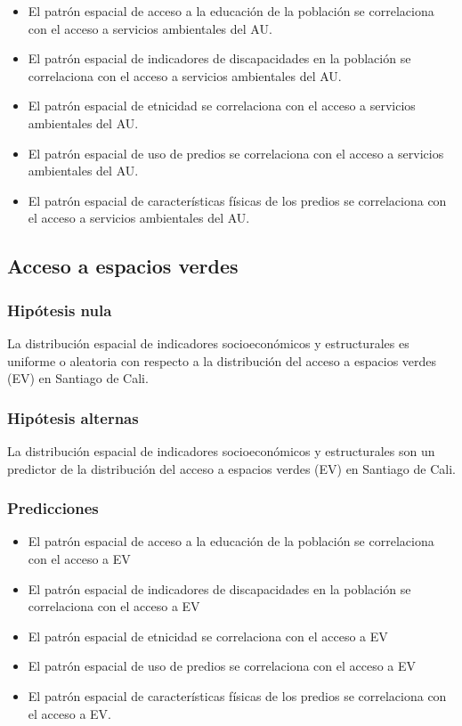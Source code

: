 \documentclass[12pt,a4paper,oneside, openany]{book}
\providecommand{\tightlist}{%
  \setlength{\itemsep}{0pt}\setlength{\parskip}{0pt}}
\theoremstyle{definition}
\theoremstyle{definition}
\theoremstyle{definition}
\theoremstyle{remark}
\begin{document}
\begin{itemize}
\tightlist
\item
  El patrón espacial de acceso a la educación de la población se
  correlaciona con el acceso a servicios ambientales del AU.
\item
  El patrón espacial de indicadores de discapacidades en la población se
  correlaciona con el acceso a servicios ambientales del AU.
\item
  El patrón espacial de etnicidad se correlaciona con el acceso a
  servicios ambientales del AU.
\item
  El patrón espacial de uso de predios se correlaciona con el acceso a
  servicios ambientales del AU.
\item
  El patrón espacial de características físicas de los predios se
  correlaciona con el acceso a servicios ambientales del AU.
\end{itemize}

\subsection{Acceso a espacios verdes}\label{acceso-a-espacios-verdes}

\subsubsection{Hipótesis nula}\label{hipuxf3tesis-nula-1}

La distribución espacial de indicadores socioeconómicos y estructurales
es uniforme o aleatoria con respecto a la distribución del acceso a
espacios verdes (EV) en Santiago de Cali.

\subsubsection{Hipótesis alternas}\label{hipuxf3tesis-alternas-1}

La distribución espacial de indicadores socioeconómicos y estructurales
son un predictor de la distribución del acceso a espacios verdes (EV) en
Santiago de Cali.

\subsubsection{Predicciones}\label{predicciones-1}

\begin{itemize}
\tightlist
\item
  El patrón espacial de acceso a la educación de la población se
  correlaciona con el acceso a EV
\item
  El patrón espacial de indicadores de discapacidades en la población se
  correlaciona con el acceso a EV
\item
  El patrón espacial de etnicidad se correlaciona con el acceso a EV
\item
  El patrón espacial de uso de predios se correlaciona con el acceso a
  EV
\item
  El patrón espacial de características físicas de los predios se
  correlaciona con el acceso a EV.
\end{itemize}
\end{document}
